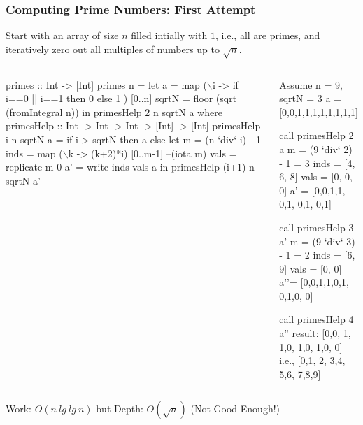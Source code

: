 \documentclass{beamer}
\renewcommand{\emph}[1]{\textcolor{structure}{#1}}
\newcommand{\emp}[1]{\textcolor{DikuRed}{ #1}}
\newcommand{\mymath}[1]{$ #1 $}
\begin{document}
\begin{frame}[fragile,t]
  \frametitle{Computing Prime Numbers: First Attempt}

Start with an array of size $n$ filled intially with $1$,
i.e., all are primes, and iteratively zero out all multiples
of numbers up to $\sqrt{n}$.

\begin{columns}
\begin{colorcode}[fontsize=\scriptsize]
primes :: Int -> [Int]
primes n = 
  let a = map (\mymath{\backslash}i -> if i==0 || i==1
                     then 0
                     else 1 ) [0..n]
      sqrtN = floor (sqrt (fromIntegral n))
  in  primesHelp 2 n sqrtN a
  where
    primesHelp :: Int -> Int -> Int 
               -> [Int] -> [Int]
    primesHelp i n sqrtN a = 
      if i > sqrtN then a
      else let m    = (n `div` i) - 1
               inds = \emph{map (\mymath{\backslash}k -> (k+2)*i)} 
                          \emph{[0..m-1]} --(iota m)
               vals = \emph{replicate m 0}
               a'   = \emph{write inds vals a}
           in  primesHelp (i+1) n sqrtN a'
\end{colorcode}
\begin{colorcode}[fontsize=\scriptsize]
Assume n = 9, sqrtN = 3 
a = [0,0,1,1,1,1,1,1,1,1]

call primesHelp 2 a
m    = (9 `div` 2) - 1 = 3
inds = [4, 6, 8]
vals = [0, 0, 0]
a' = [0,0,1,1,\emp{0},1,\emp{0},1,\emp{0},1]

call primesHelp 3 a'
m    = (9 `div` 3) - 1 = 2
inds = [6, 9]
vals = [0, 0]
a''= [0,0,1,1,0,1,\emp{0},1,0,\emp{0}]

call primesHelp 4 a''
result: [0,0,\emp{1},\emp{1},0,\emp{1},0,\emp{1},0,\emp{0}]
  i.e., [0,1,\emp{2},\emp{3},4,\emp{5},6,\emp{7},8,9]
\end{colorcode}
\end{columns}
\medskip

\emph{Work: $O(n \ lg \ lg \ n)$} but \emp{Depth: $O(\sqrt{n})$ (Not Good Enough!)}

\end{frame}
\end{document}

